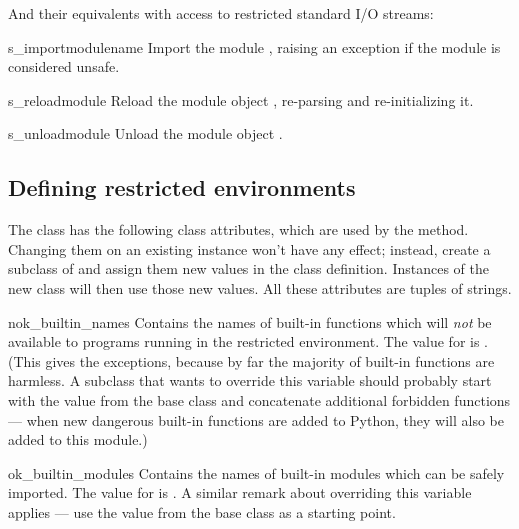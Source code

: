 And their equivalents with access to restricted standard I/O streams:

\begin{methoddesc}{s_import}{modulename}
Import the module , raising an 
exception if the module is considered unsafe.
\end{methoddesc}

\begin{methoddesc}{s_reload}{module}
Reload the module object , re-parsing and re-initializing it.  
\end{methoddesc}

\begin{methoddesc}{s_unload}{module}
Unload the module object .   
\end{methoddesc}


\subsection{Defining restricted environments \label{rexec-extension}}

The  class has the following class attributes, which are
used by the  method.  Changing them on an existing
instance won't have any effect; instead, create a subclass of
 and assign them new values in the class definition.
Instances of the new class will then use those new values.  All these
attributes are tuples of strings.

\begin{memberdesc}{nok_builtin_names}
Contains the names of built-in functions which will \emph{not} be
available to programs running in the restricted environment.  The
value for  is .
(This gives the exceptions, because by far the majority of built-in
functions are harmless.  A subclass that wants to override this
variable should probably start with the value from the base class and
concatenate additional forbidden functions --- when new dangerous
built-in functions are added to Python, they will also be added to
this module.)
\end{memberdesc}

\begin{memberdesc}{ok_builtin_modules}
Contains the names of built-in modules which can be safely imported.
The value for  is .  A
similar remark about overriding this variable applies --- use the
value from the base class as a starting point.
\end{memberdesc}

